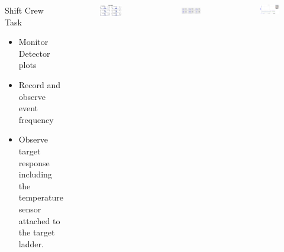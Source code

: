 \documentclass{beamer}
\begin{document}
\begin{frame}
	\begin{columns}[c]
	\begin{block}{Shift Crew Task}
		\begin{itemize}
			\item Monitor Detector plots 
			\item Record and observe event frequency
			\item Observe target response including the temperature sensor attached to the target ladder.
		\end{itemize}
	\end{block}


	\vspace{-40pt}
	\begin{figure}
		\includegraphics[width=6cm]{../images/OnlineGui}
	\end{figure}
	\vspace{-20pt}
	\begin{figure}
		\includegraphics[width=5cm]{../images/scaler}
	\end{figure}
	\vspace{-20pt}
	\begin{figure}
		\includegraphics[width=5cm]{../images/lattertmps_g}
	\end{figure}
	
\end{columns}
\end{frame}

\end{document}
